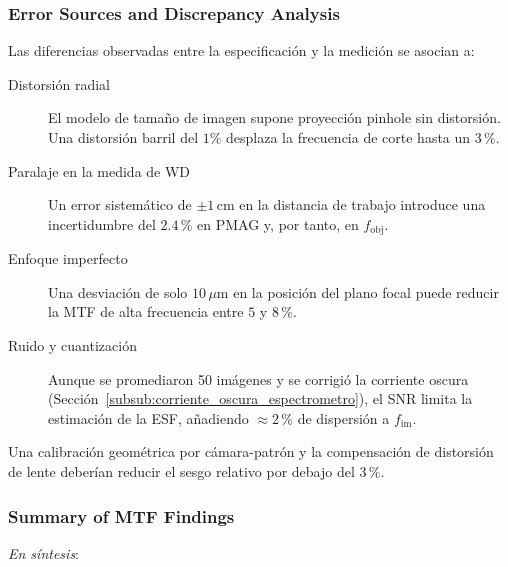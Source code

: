 
    \subsubsection{Error Sources and Discrepancy Analysis}
    \label{subsub:grd_errors}
    Las diferencias observadas entre la especificación y la medición se asocian a:

    \begin{description}
      \item[Distorsión radial]  
            El modelo de tamaño de imagen supone proyección pinhole sin distorsión.
            Una distorsión barril del \(1\%\) desplaza la frecuencia de corte
            hasta un \(3\,\%\).
      \item[Paralaje en la medida de WD]  
            Un error sistemático de \(\pm1\,\mathrm{cm}\) en la distancia
            de trabajo introduce una incertidumbre del \(2.4\,\%\) en PMAG
            y, por tanto, en \(f_{\text{obj}}\).
      \item[Enfoque imperfecto]  
            Una desviación de solo \(10\,\mu\mathrm{m}\) en la posición
            del plano focal puede reducir la MTF de alta frecuencia
            entre \(5\) y \(8\,\%\).
      \item[Ruido y cuantización]  
            Aunque se promediaron 50 imágenes y se corrigió la corriente
            oscura (Sección~\ref{subsub:corriente_oscura_espectrometro}),
            el SNR limita la estimación de la ESF, añadiendo
            \(\approx2\,\%\) de dispersión a \(f_{\text{im}}\).
    \end{description}

    Una calibración geométrica por cámara-patrón y la
    compensación de distorsión de lente deberían reducir el sesgo relativo
    por debajo del \(3\,\%\).

    \subsubsection{Summary of MTF Findings}
    \label{subsub:grd_summary}
    \emph{En síntesis}:

